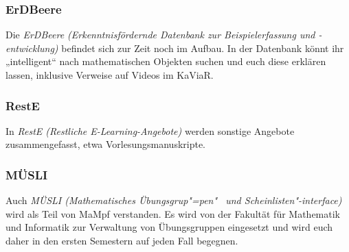 \subsubsection{ErDBeere}
Die \emph{ErDBeere (Erkenntnisfördernde Datenbank zur Beispielerfassung und -entwicklung)} befindet sich zur Zeit noch im Aufbau. In der Datenbank könnt ihr „intelligent“ nach mathematischen Objekten suchen und euch diese erklären lassen, inklusive Verweise auf Videos im KaViaR.

\subsubsection{RestE}
In \emph{RestE (Restliche E-Learning-Angebote)} werden sonstige Angebote zusammengefasst, etwa Vorlesungsmanuskripte.

\subsubsection{MÜSLI}
Auch \emph{MÜSLI (Mathematisches Übungsgrup"=pen"~ und Scheinlisten"-interface)} wird als Teil von MaMpf verstanden. Es wird von der Fakultät für Mathematik und Informatik zur Verwaltung von Übungsgruppen eingesetzt und wird euch daher in den ersten Semestern auf jeden Fall begegnen.
